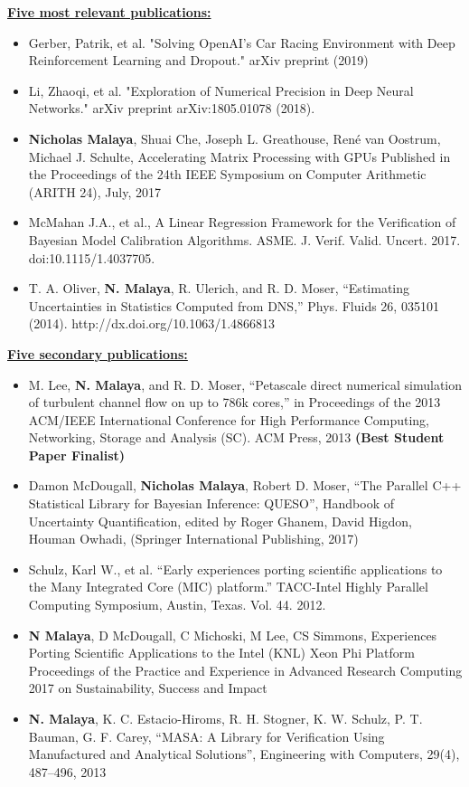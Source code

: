 \documentclass[12pt]{article}
\newcommand{\makesection}[1]{\underline{\bfseries #1:}}
\begin{document}
\makesection{Five most relevant publications}
\begin{itemize}
\item Gerber, Patrik, et al. "Solving OpenAI’s Car Racing Environment with
Deep Reinforcement Learning and Dropout." arXiv preprint (2019)
\item Li, Zhaoqi, et al. "Exploration of Numerical Precision in Deep Neural Networks." arXiv preprint arXiv:1805.01078 (2018).
\item \textbf{Nicholas Malaya}, Shuai Che, Joseph L. Greathouse, René van Oostrum,
Michael J. Schulte, Accelerating Matrix Processing with GPUs
Published in the Proceedings of the 24th IEEE Symposium on Computer
Arithmetic (ARITH 24), July, 2017 
\item McMahan J.A., et al., A Linear Regression
Framework for the Verification of Bayesian Model Calibration
Algorithms. ASME. J. Verif. Valid. Uncert. 2017. doi:10.1115/1.4037705. 
\item T. A. Oliver, \textbf{N. Malaya}, R. Ulerich, and R. D. Moser, “Estimating
Uncertainties in Statistics Computed from DNS,”
Phys. Fluids 26, 035101 (2014). http://dx.doi.org/10.1063/1.4866813 
\end{itemize}

\makesection{Five secondary publications}
\begin{itemize}
\item M. Lee, \textbf{N. Malaya}, and R. D. Moser, ``Petascale direct numerical simulation of turbulent channel flow on up to 786k cores,'' in Proceedings 
of the 2013 ACM/IEEE International Conference for High Performance
Computing, Networking, Storage and Analysis (SC). ACM Press, 2013 {\bf(Best
Student Paper Finalist)}
\item Damon McDougall, \textbf{Nicholas Malaya}, Robert D. Moser, ``The Parallel C++
Statistical Library for Bayesian Inference: QUESO'', Handbook of
Uncertainty Quantification, edited by Roger Ghanem, David Higdon, Houman
Owhadi, (Springer International Publishing, 2017) 
\item Schulz, Karl W., et al. ``Early experiences porting scientific applications to the Many Integrated Core (MIC) platform.'' TACC-Intel Highly Parallel Computing Symposium, Austin, Texas. Vol. 44. 2012.
\item \textbf{N Malaya}, D McDougall, C Michoski, M Lee, CS Simmons,
Experiences Porting Scientific Applications to the Intel (KNL) Xeon Phi Platform
Proceedings of the Practice and Experience in Advanced Research Computing
2017 on Sustainability, Success and Impact
\item \textbf{N. Malaya}, K. C. Estacio-Hiroms, R. H. Stogner, K. W. Schulz, P. T. Bauman,
G. F. Carey, ``MASA: A Library for Verification Using Manufactured and Analytical Solutions'',
Engineering with Computers, 29(4), 487--496, 2013
\end{itemize}
\end{document}
